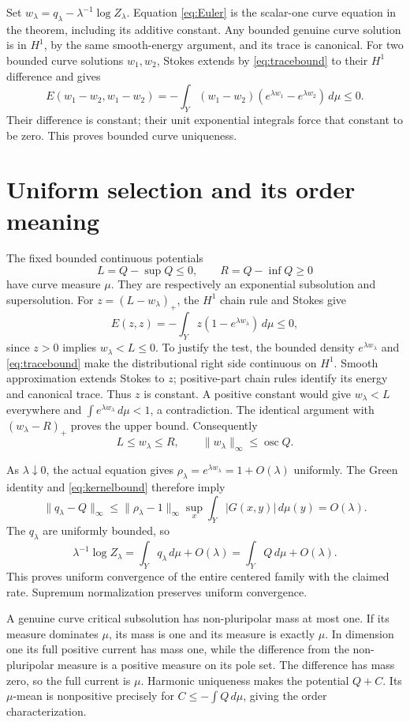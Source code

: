 \documentclass[11pt]{article}
\theoremstyle{remark}\newtheorem{remark}[theorem]{Remark}
\begin{document}
Set $w_\lambda=q_\lambda-\lambda^{-1}\log Z_\lambda$.
Equation \eqref{eq:Euler} is the scalar-one curve equation in the
theorem, including its additive constant. Any bounded genuine curve
solution is in $H^1$, by the same smooth-energy argument, and its
trace is canonical. For two bounded curve solutions $w_1,w_2$,
Stokes extends by \eqref{eq:tracebound} to their $H^1$ difference and gives
\[
 E(w_1-w_2,w_1-w_2)
 =-\int_Y(w_1-w_2)(e^{\lambda w_1}-e^{\lambda w_2})\,d\mu\leq0.
\]
Their difference is constant; their unit exponential integrals force
that constant to be zero. This proves bounded curve uniqueness.

\section{Uniform selection and its order meaning}
The fixed bounded continuous potentials
\[
 L=Q-\sup Q\leq0,\qquad R=Q-\inf Q\geq0
\]
have curve measure $\mu$. They are respectively an exponential
subsolution and supersolution. For $z=(L-w_\lambda)_+$, the
$H^1$ chain rule and Stokes give
\[
 E(z,z)=-\int_Yz(1-e^{\lambda w_\lambda})\,d\mu\leq0,
\]
since $z>0$ implies $w_\lambda<L\leq0$.
To justify the test, the bounded density $e^{\lambda w_\lambda}$ and
\eqref{eq:tracebound} make the distributional right side continuous
on $H^1$. Smooth approximation extends Stokes to $z$; positive-part
chain rules identify its energy and canonical trace. Thus $z$ is
constant. A positive constant would give $w_\lambda<L$ everywhere and
$\int e^{\lambda w_\lambda}\,d\mu<1$, a contradiction. The identical
argument with $(w_\lambda-R)_+$ proves the upper bound. Consequently
\begin{equation}\label{eq:uniformbound}
 L\leq w_\lambda\leq R,\qquad
 \|w_\lambda\|_\infty\leq\operatorname{osc}Q.
\end{equation}

As $\lambda\downarrow0$, the actual equation gives
$\rho_\lambda=e^{\lambda w_\lambda}=1+O(\lambda)$ uniformly.
The Green identity and \eqref{eq:kernelbound} therefore imply
\[
 \|q_\lambda-Q\|_\infty
 \leq\|\rho_\lambda-1\|_\infty
       \sup_x\int_Y|G(x,y)|\,d\mu(y)=O(\lambda).
\]
The $q_\lambda$ are uniformly bounded, so
\[
 \lambda^{-1}\log Z_\lambda
  =\int_Yq_\lambda\,d\mu+O(\lambda)
  =\int_YQ\,d\mu+O(\lambda).
\]
This proves uniform convergence of the entire centered family with
the claimed rate. Supremum normalization preserves uniform convergence.

A genuine curve critical subsolution has non-pluripolar mass at most
one. If its measure dominates $\mu$, its mass is one and its measure
is exactly $\mu$. In dimension one its full positive current has
mass one, while the difference from the non-pluripolar measure is a
positive measure on its pole set. The difference has mass zero, so
the full current is $\mu$. Harmonic uniqueness makes the potential
$Q+C$. Its $\mu$-mean is nonpositive precisely for
$C\leq-\int Q\,d\mu$, giving the order characterization.
\end{document}
